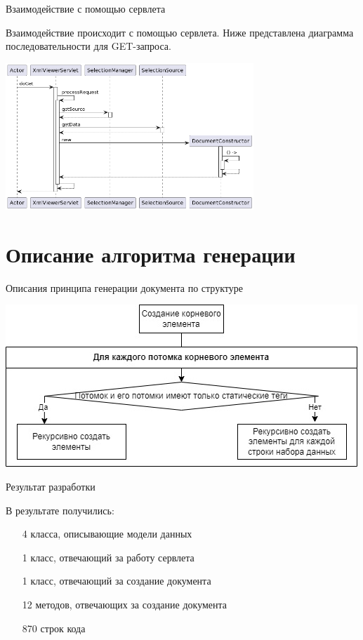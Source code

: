 \documentclass[fullscreen=true,russian,compress,%
	hyperref={unicode,bookmarks=false}]{presentation}
\begin{document}
\begin{frame}{Взаимодействие с помощью сервлета}

Взаимодействие происходит с помощью сервлета. Ниже представлена диаграмма последовательности для GET-запроса.

\hfill

\centerline{\includegraphics[width=0.7\textwidth]{imgs/usingservlet.png}}

\end{frame}

\section{Описание алгоритма генерации}

\begin{frame}{Описания принципа генерации документа по структуре}

\centerline{\includegraphics[width=\textwidth]{imgs/diagr.jpg}}

\end{frame}

\begin{frame}{Результат разработки}

В результате получились:

\begin{enumerate}
	\item[4] класса, описывающие модели данных
    \item[1] класс, отвечающий за работу сервлета
    \item[1] класс, отвечающий за создание документа
    \item[12] методов, отвечающих за создание документа
    \item[870] строк кода
\end{enumerate}

\end{frame}
\end{document}
